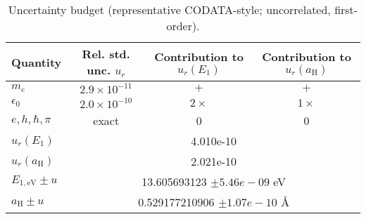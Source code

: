 \begin{table}[t]
\caption{Uncertainty budget (representative CODATA-style; uncorrelated, first-order).}
\label{tab:uncertainty}
\centering
\begin{tabular}{lccc}
\toprule
Quantity & Rel. std. unc. $u_r$ & Contribution to $u_r(E_1)$ & Contribution to $u_r(a_\mathrm{H})$ \\
\midrule
$m_e$ & $2.9\times10^{-11}$ & $+$ & $+$ \\
$\epsilon_0$ & $2.0\times10^{-10}$ & $2\times$ & $1\times$ \\
$e, h, \hbar, \pi$ & exact & 0 & 0 \\
\midrule
$u_r(E_1)$ & \multicolumn{3}{c}{4.010e-10} \\
$u_r(a_\mathrm{H})$ & \multicolumn{3}{c}{2.021e-10} \\
\midrule
$E_{1,\mathrm{eV}} \pm u$ & \multicolumn{3}{c}{13.605693123 \(\pm 5.46e-09\) eV} \\
$a_\mathrm{H} \pm u$ & \multicolumn{3}{c}{0.529177210906 \(\pm 1.07e-10\) \AA} \\
\bottomrule
\end{tabular}
\end{table}
